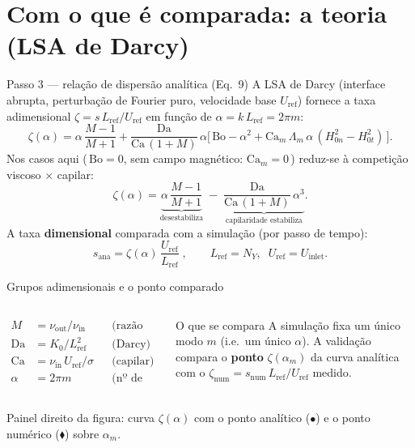 \documentclass[aspectratio=169,11pt]{beamer}
\newcommand{\Da}{\mathrm{Da}}
\newcommand{\Ca}{\mathrm{Ca}}
\newcommand{\Bo}{\mathrm{Bo}}
\newcommand{\Cam}{\mathrm{Ca}_m}
\newcommand{\Lref}{L_{\mathrm{ref}}}
\newcommand{\Uref}{U_{\mathrm{ref}}}
\newcommand{\snum}{s_{\mathrm{num}}}
\newcommand{\sana}{s_{\mathrm{ana}}}
\begin{document}
\section{Com o que é comparada: a teoria (LSA de Darcy)}
\begin{frame}{Passo 3 — relação de dispersão analítica (Eq.~9)}
  A LSA de Darcy (interface abrupta, perturbação de Fourier puro, velocidade
  base $\Uref$) fornece a taxa adimensional $\zeta = s\,\Lref/\Uref$ em função
  de $\alpha = k\,\Lref = 2\pi m$:
  \begin{equation*}
    \zeta(\alpha) = \alpha\,\frac{M-1}{M+1}
    + \frac{\Da}{\Ca\,(1+M)}\,\alpha
    \big[\,\Bo - \alpha^2 + \Cam\,\Lambda_m\,\alpha\,(H_{0n}^2-H_{0t}^2)\,\big].
  \end{equation*}
  Nos casos aqui (\,$\Bo=0$, sem campo magnético: $\Cam=0$\,) reduz-se à
  competição viscoso $\times$ capilar:
  \begin{equation*}
    \zeta(\alpha) = \underbrace{\alpha\,\frac{M-1}{M+1}}_{\text{desestabiliza}}
    \;-\;\underbrace{\frac{\Da}{\Ca\,(1+M)}\,\alpha^3}_{\text{capilaridade estabiliza}}.
  \end{equation*}
  A taxa \textbf{dimensional} comparada com a simulação (por passo de tempo):
  \begin{equation*}
    \boxed{\;\sana = \zeta(\alpha)\,\frac{\Uref}{\Lref}\;,
    \qquad \Lref = N_Y,\;\; \Uref = U_{\mathrm{inlet}}.\;}
  \end{equation*}
\end{frame}

\begin{frame}{Grupos adimensionais e o ponto comparado}
  \begin{columns}
    \begin{align*}
      M    &= \nu_{\mathrm{out}}/\nu_{\mathrm{in}} &&\text{(razão de visc.)}\\
      \Da  &= K_0/\Lref^2 &&\text{(Darcy)}\\
      \Ca  &= \nu_{\mathrm{in}}\,\Uref/\sigma &&\text{(capilar)}\\
      \alpha &= 2\pi m &&\text{(nº de onda do modo)}
    \end{align*}
    \begin{block}{O que se compara}
      A simulação fixa um único modo $m$ (i.e.\ um único $\alpha$).
      A validação compara o \textbf{ponto} $\zeta(\alpha_m)$ da curva
      analítica com o $\zeta_{\mathrm{num}}=\snum\,\Lref/\Uref$ medido.
    \end{block}
  \end{columns}
  \vspace{0.4em}
  \begin{center}\footnotesize
    Painel direito da figura: curva $\zeta(\alpha)$ com o ponto analítico
    (\textcolor{vermelho}{$\bullet$}) e o ponto numérico
    (\textcolor{verde}{$\blacklozenge$}) sobre $\alpha_m$.
  \end{center}
\end{frame}
\end{document}

